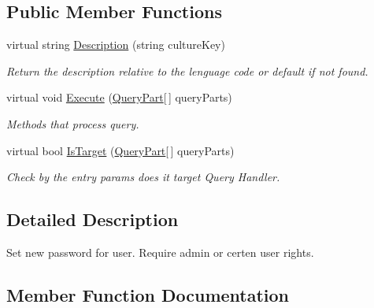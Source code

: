 \subsection*{Public Member Functions}
\begin{DoxyCompactItemize}
\item 
virtual string \mbox{\hyperlink{class_authority_controller_1_1_queries_1_1_u_s_e_r___n_e_w___p_a_s_s_w_o_r_d_a3050d851f7563bb06a3b5dbb7e3496d0}{Description}} (string culture\+Key)
\begin{DoxyCompactList}\small\item\em Return the description relative to the lenguage code or default if not found. \end{DoxyCompactList}\item 
virtual void \mbox{\hyperlink{class_authority_controller_1_1_queries_1_1_u_s_e_r___n_e_w___p_a_s_s_w_o_r_d_a567cb1f67a718cab9dae99a9d4e892d4}{Execute}} (\mbox{\hyperlink{struct_uniform_queries_1_1_query_part}{Query\+Part}}\mbox{[}$\,$\mbox{]} query\+Parts)
\begin{DoxyCompactList}\small\item\em Methods that process query. \end{DoxyCompactList}\item 
virtual bool \mbox{\hyperlink{class_authority_controller_1_1_queries_1_1_u_s_e_r___n_e_w___p_a_s_s_w_o_r_d_aef792462301f1687630b64e5479f3f73}{Is\+Target}} (\mbox{\hyperlink{struct_uniform_queries_1_1_query_part}{Query\+Part}}\mbox{[}$\,$\mbox{]} query\+Parts)
\begin{DoxyCompactList}\small\item\em Check by the entry params does it target Query Handler. \end{DoxyCompactList}\end{DoxyCompactItemize}


\subsection{Detailed Description}
Set new password for user. Require admin or certen user rights. 



\subsection{Member Function Documentation}
\mbox{\label{class_authority_controller_1_1_queries_1_1_u_s_e_r___n_e_w___p_a_s_s_w_o_r_d_a3050d851f7563bb06a3b5dbb7e3496d0}} 
